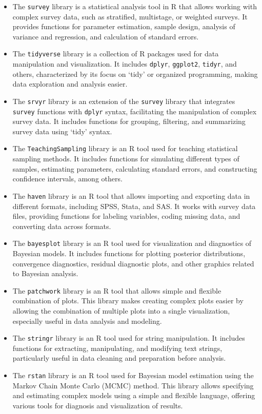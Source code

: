 \documentclass[
  12pt,
]{book}
\begin{document}
\begin{itemize}
\item
  The \texttt{survey} library is a statistical analysis tool in R that allows working with complex survey data, such as stratified, multistage, or weighted surveys. It provides functions for parameter estimation, sample design, analysis of variance and regression, and calculation of standard errors.
\item
  The \texttt{tidyverse} library is a collection of R packages used for data manipulation and visualization. It includes \texttt{dplyr}, \texttt{ggplot2}, \texttt{tidyr}, and others, characterized by its focus on `tidy' or organized programming, making data exploration and analysis easier.
\item
  The \texttt{srvyr} library is an extension of the \texttt{survey} library that integrates \texttt{survey} functions with \texttt{dplyr} syntax, facilitating the manipulation of complex survey data. It includes functions for grouping, filtering, and summarizing survey data using `tidy' syntax.
\item
  The \texttt{TeachingSampling} library is an R tool used for teaching statistical sampling methods. It includes functions for simulating different types of samples, estimating parameters, calculating standard errors, and constructing confidence intervals, among others.
\item
  The \texttt{haven} library is an R tool that allows importing and exporting data in different formats, including SPSS, Stata, and SAS. It works with survey data files, providing functions for labeling variables, coding missing data, and converting data across formats.
\item
  The \texttt{bayesplot} library is an R tool used for visualization and diagnostics of Bayesian models. It includes functions for plotting posterior distributions, convergence diagnostics, residual diagnostic plots, and other graphics related to Bayesian analysis.
\item
  The \texttt{patchwork} library is an R tool that allows simple and flexible combination of plots. This library makes creating complex plots easier by allowing the combination of multiple plots into a single visualization, especially useful in data analysis and modeling.
\item
  The \texttt{stringr} library is an R tool used for string manipulation. It includes functions for extracting, manipulating, and modifying text strings, particularly useful in data cleaning and preparation before analysis.
\item
  The \texttt{rstan} library is an R tool used for Bayesian model estimation using the Markov Chain Monte Carlo (MCMC) method. This library allows specifying and estimating complex models using a simple and flexible language, offering various tools for diagnosis and visualization of results.
\end{itemize}
\end{document}
